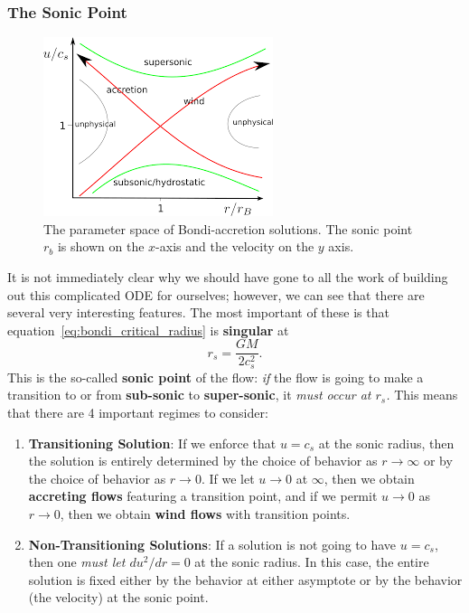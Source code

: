 \subsubsection{The Sonic Point}
\begin{figure}
    \centering
    \includegraphics[width=0.75\linewidth]{Pictures/figures/bondi_regime.png}
    \caption{The parameter space of Bondi-accretion solutions. The sonic point $r_b$ is shown on the $x$-axis and the velocity on the $y$ axis.}
    \label{fig:bondi_regime}
\end{figure}
It is not immediately clear why we should have gone to all the work of building out this complicated ODE for ourselves; however, we can see that there are several very interesting features. The most important of these is that equation~\eqref{eq:bondi_critical_radius} is \textbf{singular} at 
\begin{equation}
    \label{eq:bondi_critical_radius}
    \boxed{
    r_s = \frac{GM}{2c_s^2}.
    }
\end{equation}
 This is the so-called \textbf{sonic point} of the flow: \textit{if} the flow is going to make a transition to or from \textbf{sub-sonic} to \textbf{super-sonic}, it \textit{must occur at $r_s$.} This means that there are 4 important regimes to consider:
\vspace{0.5cm}
\begin{enumerate}
    \item \textbf{Transitioning Solution}: If we enforce that $u = c_s$ at the sonic radius, then the solution is entirely determined by the choice of behavior as $r\to \infty$ or by the choice of behavior as $r\to0$. If we let $u \to 0$ at $\infty$, then we obtain \textbf{accreting flows} featuring a transition point, and if we permit $u \to 0$ as $r\to 0$, then we obtain \textbf{wind flows} with transition points.
    \item \textbf{Non-Transitioning Solutions}: If a solution is not going to have $u=c_s$, then one \textit{must let $du^2/dr = 0$} at the sonic radius. In this case, the entire solution is fixed either by the behavior at either asymptote or by the behavior (the velocity) at the sonic point.
\end{enumerate}
\vspace{0.5cm}

